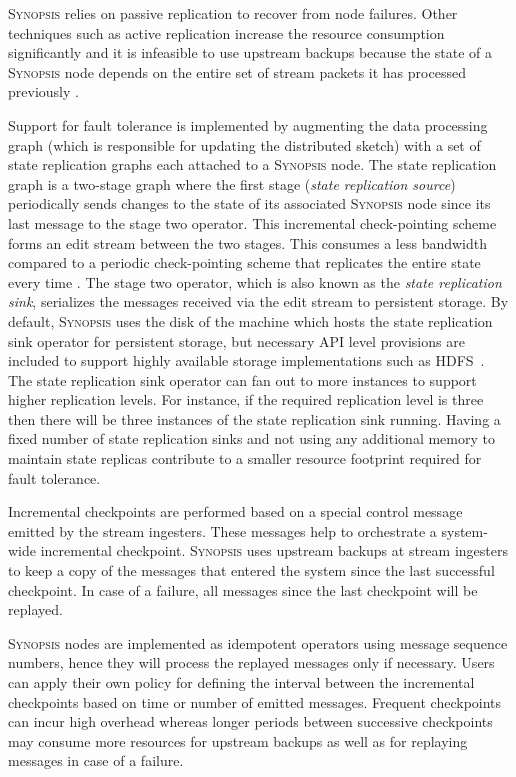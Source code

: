 \textsc{Synopsis} relies on passive replication to recover from node failures.
Other techniques such as active replication increase the resource consumption significantly and it is infeasible to use upstream backups because the state of a \textsc{Synopsis} node depends on the entire set of stream packets it has processed previously \cite{castro2013integrating}.

Support for fault tolerance is implemented by augmenting the data processing graph (which is responsible for updating the distributed sketch) 	with a set of state replication graphs each attached to a \textsc{Synopsis} node.
The state replication graph is a two-stage graph where the first stage (\textit{state replication source}) periodically sends changes to the state of its associated \textsc{Synopsis} node since its last message to the stage two operator.
This incremental check-pointing scheme forms an edit stream between the two stages.
This consumes a less bandwidth compared to a periodic check-pointing scheme that replicates the entire state every time \cite{castro2013integrating}.
The stage two operator, which is also known as the \textit{state replication sink}, serializes the messages received via the edit stream to persistent storage.
By default, \textsc{Synopsis} uses the disk of the machine which hosts the state replication sink operator for persistent storage, but necessary API level provisions are included to support highly available storage implementations such as HDFS~\cite{borthakur2008hdfs}.
The state replication sink operator can fan out to more instances to support higher replication levels.
For instance, if the required replication level is three then there will be three instances of the state replication sink running.
Having a fixed number of state replication sinks and not using any additional memory to maintain state replicas contribute to a smaller resource footprint required for fault tolerance.

Incremental checkpoints are performed based on a special control message emitted by the stream ingesters.
These messages help to orchestrate a system-wide incremental checkpoint.
\textsc{Synopsis} uses upstream backups at stream ingesters to keep a copy of the messages that entered the system since the last successful checkpoint.
In case of a failure, all messages since the last checkpoint will be replayed.

\textsc{Synopsis} nodes are implemented as idempotent operators using message sequence numbers, hence they will process the replayed messages only if necessary.
Users can apply their own policy for defining the interval between the incremental checkpoints based on time or number of emitted messages.
Frequent checkpoints can incur high overhead whereas longer periods between successive checkpoints may consume more resources for upstream backups as well as for replaying messages in case of a failure.

